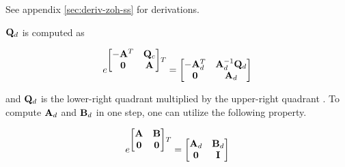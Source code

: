 See appendix \ref{sec:deriv-zoh-ss} for derivations.

$\mathbf{Q}_d$ is computed as

\begin{equation*}
  e^{
  \begin{bmatrix}
    -\mathbf{A}^T & \mathbf{Q}_c \\
    \mathbf{0} & \mathbf{A}
  \end{bmatrix}T} =
  \begin{bmatrix}
    -\mathbf{A}_d^T & \mathbf{A}_d^{-1} \mathbf{Q}_d \\
    \mathbf{0} & \mathbf{A}_d
  \end{bmatrix}
\end{equation*}

and $\mathbf{Q}_d$ is the lower-right quadrant multiplied by the upper-right
quadrant \cite{bib:integral_matrix_exp}. To compute $\mathbf{A}_d$ and $\mathbf{B}_d$
in one step, one can utilize the following property.

\begin{equation*}
  e^{
  \begin{bmatrix}
    \mathbf{A} & \mathbf{B} \\
    \mathbf{0} & \mathbf{0}
  \end{bmatrix}T} =
  \begin{bmatrix}
    \mathbf{A}_d & \mathbf{B}_d \\
    \mathbf{0} & \mathbf{I}
  \end{bmatrix}
\end{equation*}
